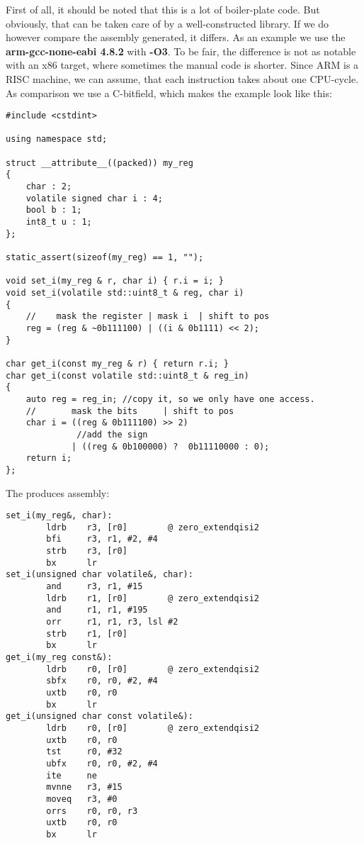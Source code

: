 \documentclass{scrreprt}
\begin{document}
First of all, it should be noted that this is a lot of boiler-plate code. But
obviously, that can be taken care of by a well-constructed library. If we do
however compare the assembly generated, it differs. As an example we use the
\textbf{arm-gcc-none-eabi 4.8.2} with \textbf{-O3}. To be fair, the difference
is not as notable with an x86 target, where sometimes the manual code is
shorter. Since ARM is a RISC machine, we can assume, that each instruction takes
about one CPU-cycle. As comparison we use a C-bitfield, which makes the example
look like this:
\begin{lstlisting}
#include <cstdint>

using namespace std;

struct __attribute__((packed)) my_reg
{
	char : 2;
	volatile signed char i : 4;
	bool b : 1;
	int8_t u : 1;
};

static_assert(sizeof(my_reg) == 1, "");

void set_i(my_reg & r, char i) { r.i = i; }
void set_i(volatile std::uint8_t & reg, char i)
{
	//    mask the register | mask i  | shift to pos
	reg = (reg & ~0b111100) | ((i & 0b1111) << 2);
}

char get_i(const my_reg & r) { return r.i; }
char get_i(const volatile std::uint8_t & reg_in)
{
	auto reg = reg_in; //copy it, so we only have one access.
	//       mask the bits     | shift to pos
	char i = ((reg & 0b111100) >> 2)
			  //add the sign	
      		 | ((reg & 0b100000) ?  0b11110000 : 0);
	return i;
};
\end{lstlisting}
\newpage
The produces assembly:
\begin{lstlisting}
set_i(my_reg&, char):
        ldrb    r3, [r0]        @ zero_extendqisi2
        bfi     r3, r1, #2, #4
        strb    r3, [r0]
        bx      lr
set_i(unsigned char volatile&, char):
        and     r3, r1, #15
        ldrb    r1, [r0]        @ zero_extendqisi2
        and     r1, r1, #195
        orr     r1, r1, r3, lsl #2
        strb    r1, [r0]
        bx      lr
get_i(my_reg const&):
        ldrb    r0, [r0]        @ zero_extendqisi2
        sbfx    r0, r0, #2, #4
        uxtb    r0, r0
        bx      lr
get_i(unsigned char const volatile&):
        ldrb    r0, [r0]        @ zero_extendqisi2
        uxtb    r0, r0
        tst     r0, #32
        ubfx    r0, r0, #2, #4
        ite     ne
        mvnne   r3, #15
        moveq   r3, #0
        orrs    r0, r0, r3
        uxtb    r0, r0
        bx      lr

\end{lstlisting}
\end{document}
